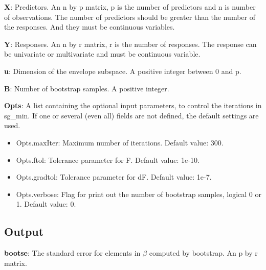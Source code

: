 \documentclass[a4paper,11pt,openany]{memoir}
\begin{document}
\begin{par}
\textbf{X}: Predictors. An n by p matrix, p is the number of predictors and n is number of observations. The number of predictors should be greater than the number of the responses. And they must be continuous variables.
\end{par} \vspace{1em}
\begin{par}
\textbf{Y}: Responses. An n by r matrix, r is the number of responses. The response can be univariate or multivariate and must be continuous variable.
\end{par} \vspace{1em}
\begin{par}
\textbf{u}: Dimension of the envelope subspace.  A positive integer between 0 and p.
\end{par} \vspace{1em}
\begin{par}
\textbf{B}: Number of bootstrap samples.  A positive integer.
\end{par} \vspace{1em}
\begin{par}
\textbf{Opts}: A list containing the optional input parameters, to control the iterations in sg\_min. If one or several (even all) fields are not defined, the default settings are used.
\end{par} \vspace{1em}
\begin{itemize}
\setlength{\itemsep}{-1ex}
   \item Opts.maxIter: Maximum number of iterations.  Default value: 300.
   \item Opts.ftol: Tolerance parameter for F.  Default value: 1e-10.
   \item Opts.gradtol: Tolerance parameter for dF.  Default value: 1e-7.
   \item Opts.verbose: Flag for print out the number of bootstrap samples, logical 0 or 1. Default value: 0.
\end{itemize}


\subsection*{Output}

\begin{par}
\textbf{bootse}: The standard error for elements in $\beta$ computed by bootstrap.  An p by r matrix.
\end{par} \vspace{1em}
\end{document}
